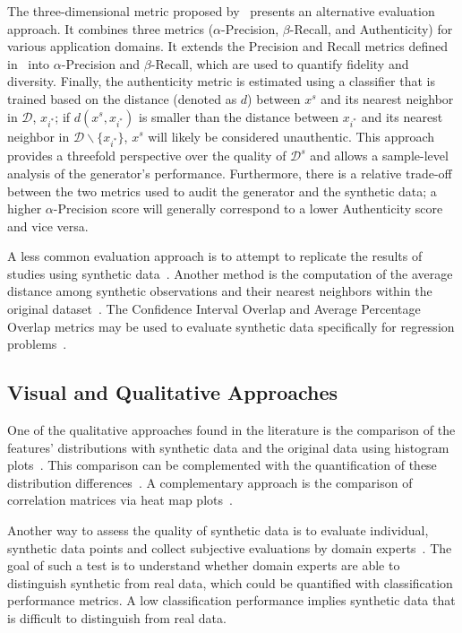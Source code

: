 The three-dimensional metric proposed by~\cite{alaa2022faithful} presents an
alternative evaluation approach. It combines three metrics
($\alpha$-Precision, $\beta$-Recall, and Authenticity) for various application
domains. It extends the Precision and Recall metrics defined
in~\cite{sajjadi2018assessing} into $\alpha$-Precision and $\beta$-Recall,
which are used to quantify fidelity and diversity. Finally, the authenticity
metric is estimated using a classifier that is trained based on the distance
(denoted as $d$) between $x^s$ and its nearest neighbor in $\mathcal{D}$,
$x_{i^*}$; if $d(x^s, x_{i^*})$ is smaller than the distance between $x_{i^*}$
and its nearest neighbor in $\mathcal{D}\backslash \{x_{i^*}\}$, $x^s$ will
likely be considered unauthentic. This approach provides a threefold
perspective over the quality of $\mathcal{D}^s$ and allows a sample-level
analysis of the generator's performance. Furthermore, there is a relative
trade-off between the two metrics used to audit the generator and the
synthetic data; a higher $\alpha$-Precision score will generally correspond to
a lower Authenticity score and vice versa.

A less common evaluation approach is to attempt to replicate the results of
studies using synthetic data~\cite{el2020seven, benaim2020analyzing,
rosenblatt2022epistemic}. Another method is the computation of the
average distance among synthetic observations and their nearest neighbors
within the original dataset~\cite{hittmeir2019utility}. The Confidence
Interval Overlap and Average Percentage Overlap metrics may be used to
evaluate synthetic data specifically for regression
problems~\cite{khan2022utility, karr2006framework}.

\subsection{Visual and Qualitative Approaches}

One of the qualitative approaches found in the literature is the comparison of
the features' distributions with synthetic data and the original data using
histogram plots~\cite{hittmeir2019utility}. This comparison can be
complemented with the quantification of these distribution
differences~\cite{el2020seven}. A complementary approach is the comparison of
correlation matrices via heat map plots~\cite{hittmeir2019utility}.

Another way to assess the quality of synthetic data is to evaluate
individual, synthetic data points and collect subjective
evaluations by domain experts~\cite{el2020seven}. The goal of such a test is to
understand whether domain experts are able to distinguish synthetic from real
data, which could be quantified with classification performance metrics. A low
classification performance implies synthetic data that is difficult to
distinguish from real data.
